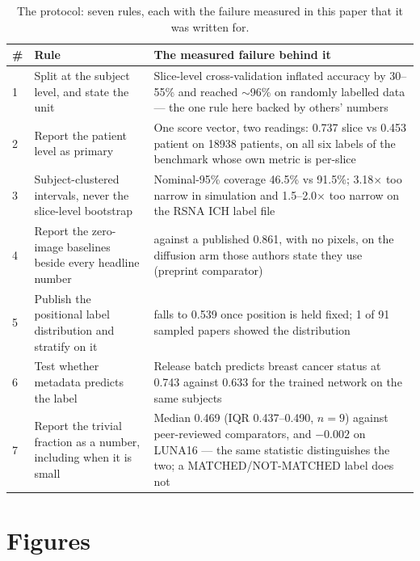 \documentclass[11pt,a4paper]{article}
\begin{document}
\begin{table}[htbp]
\centering
\caption{The protocol: seven rules, each with the failure measured in this paper
that it was written for.}
\label{tab:protocol}
\small
\begin{tabular}{p{}>{\raggedright\arraybackslash}p{}>{\raggedright\arraybackslash}p{}}
\toprule
\# & Rule & The measured failure behind it\\
\midrule
1 & Split at the subject level, and state the unit & Slice-level cross-validation inflated accuracy by 30--55\% and reached $\sim$96\% on randomly labelled data \citep{yagis2021leakage} --- the one rule here backed by others' numbers\\
2 & Report the patient level as primary & One score vector, two readings: 0.737 slice vs 0.453 patient on \num{18938} patients, on all six labels of the benchmark whose own metric is per-slice\\
3 & Subject-clustered intervals, never the slice-level bootstrap & Nominal-95\% coverage 46.5\% vs 91.5\%; 3.18$\times$ too narrow in simulation and 1.5--2.0$\times$ too narrow on the RSNA ICH label file\\
4 & Report the zero-image baselines beside every headline number & 0.851 against a published 0.861, with no pixels, on the diffusion arm those authors state they use (preprint comparator)\\
5 & Publish the positional label distribution and stratify on it & 0.851 falls to 0.539 once position is held fixed; 1 of 91 sampled papers showed the distribution\\
6 & Test whether metadata predicts the label & Release batch predicts breast cancer status at 0.743 against 0.633 for the trained network on the same subjects\\
7 & Report the trivial fraction as a number, including when it is small & Median 0.469 (IQR 0.437--0.490, $n=9$) against peer-reviewed comparators, and $-0.002$ on LUNA16 --- the same statistic distinguishes the two; a MATCHED/NOT-MATCHED label does not\\
\bottomrule
\end{tabular}
\end{table}

\clearpage
\section*{Figures}
\end{document}
